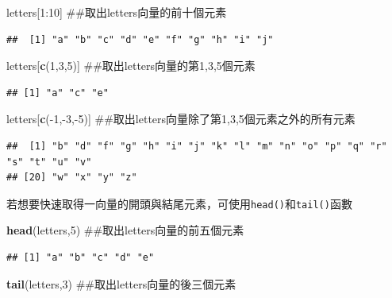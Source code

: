 \documentclass[]{book}
\newenvironment{Shaded}{\begin{snugshade}}{\end{snugshade}}
\newcommand{\KeywordTok}[1]{\textcolor[rgb]{0.13,0.29,0.53}{\textbf{{#1}}}}
\newcommand{\DecValTok}[1]{\textcolor[rgb]{0.00,0.00,0.81}{{#1}}}
\newcommand{\NormalTok}[1]{{#1}}
\theoremstyle{definition}
\theoremstyle{definition}
\theoremstyle{remark}
\begin{document}
\begin{Shaded}
\begin{Highlighting}[]
\NormalTok{letters[}\DecValTok{1}\NormalTok{:}\DecValTok{10}\NormalTok{] ##取出letters向量的前十個元素}
\end{Highlighting}
\end{Shaded}

\begin{verbatim}
##  [1] "a" "b" "c" "d" "e" "f" "g" "h" "i" "j"
\end{verbatim}

\begin{Shaded}
\begin{Highlighting}[]
\NormalTok{letters[}\KeywordTok{c}\NormalTok{(}\DecValTok{1}\NormalTok{,}\DecValTok{3}\NormalTok{,}\DecValTok{5}\NormalTok{)] ##取出letters向量的第1,3,5個元素}
\end{Highlighting}
\end{Shaded}

\begin{verbatim}
## [1] "a" "c" "e"
\end{verbatim}

\begin{Shaded}
\begin{Highlighting}[]
\NormalTok{letters[}\KeywordTok{c}\NormalTok{(-}\DecValTok{1}\NormalTok{,-}\DecValTok{3}\NormalTok{,-}\DecValTok{5}\NormalTok{)] ##取出letters向量除了第1,3,5個元素之外的所有元素}
\end{Highlighting}
\end{Shaded}

\begin{verbatim}
##  [1] "b" "d" "f" "g" "h" "i" "j" "k" "l" "m" "n" "o" "p" "q" "r" "s" "t" "u" "v"
## [20] "w" "x" "y" "z"
\end{verbatim}

若想要快速取得一向量的開頭與結尾元素，可使用\texttt{head()}和\texttt{tail()}函數

\begin{Shaded}
\begin{Highlighting}[]
\KeywordTok{head}\NormalTok{(letters,}\DecValTok{5}\NormalTok{) ##取出letters向量的前五個元素}
\end{Highlighting}
\end{Shaded}

\begin{verbatim}
## [1] "a" "b" "c" "d" "e"
\end{verbatim}

\begin{Shaded}
\begin{Highlighting}[]
\KeywordTok{tail}\NormalTok{(letters,}\DecValTok{3}\NormalTok{) ##取出letters向量的後三個元素}
\end{Highlighting}
\end{Shaded}
\end{document}
